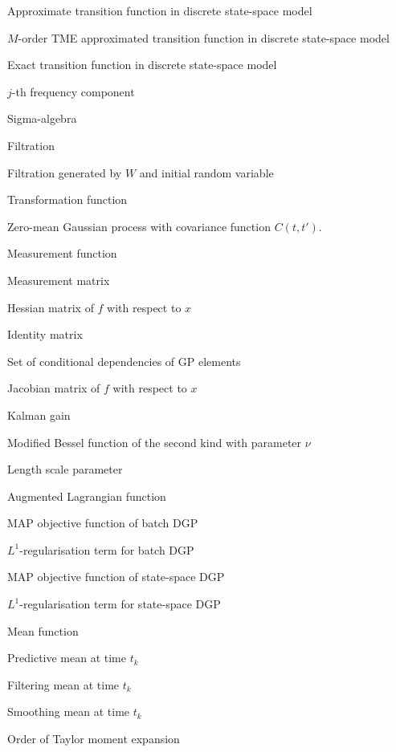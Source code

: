 \begin{description}[style=multiline,leftmargin=3cm]
\item[$f$] Approximate transition function in discrete state-space model
\item[$f^M$] $M$-order TME approximated transition function in discrete state-space model
\item[$\check{f}$] Exact transition function in discrete state-space model
\item[$\mathring{f}_j$] $j$-th frequency component
\item[$\FF$] Sigma-algebra
\item[$\FF_t$] Filtration
\item[$\FF_t^W$] Filtration generated by $W$ and initial random variable
\item[$g$] Transformation function
\item[$\mathrm{GP}(0, C(t,t'))$] Zero-mean Gaussian process with covariance function $C(t,t')$.
\item[$h$] Measurement function
\item[$H$] Measurement matrix
\item[$\hessian_x f$] Hessian matrix of $f$ with respect to $x$
\item[$I$] Identity matrix
\item[$J$] Set of conditional dependencies of GP elements
\item[$\jacob_x f$] Jacobian matrix of $f$ with respect to $x$
\item[$K$] Kalman gain
\item[$\mBesselsec$] Modified Bessel function of the second kind with parameter $\nu$
\item[$\ell$] Length scale parameter
\item[$\mathcal{L}^\mathrm{A}$] Augmented Lagrangian function
\item[$\mathcal{L}^\mathrm{B}$] MAP objective function of batch DGP
\item[$\mathcal{L}^\mathrm{B-REG}$] $L^1$-regularisation term for batch DGP
\item[$\mathcal{L}^\mathrm{S}$] MAP objective function of state-space DGP
\item[$\mathcal{L}^\mathrm{S-REG}$] $L^1$-regularisation term for state-space DGP
\item[$m(t)$] Mean function
\item[$m^-_k$] Predictive mean at time $t_k$
\item[$m^f_k$] Filtering mean at time $t_k$
\item[$m^s_k$] Smoothing mean at time $t_k$ 
\item[$M$] Order of Taylor moment expansion

\end{description}
